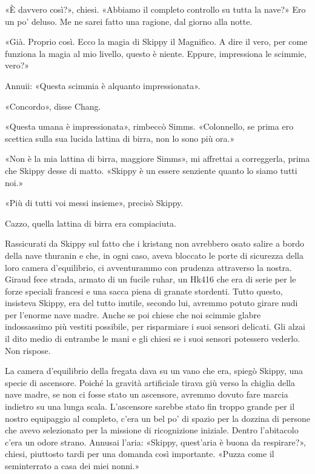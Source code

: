 «È davvero così?», chiesi. «Abbiamo il completo controllo su tutta la
nave?» Ero un po' deluso. Me ne sarei fatto una ragione, dal giorno alla
notte.

«Già. Proprio così. Ecco la magia di Skippy il Magnifico. A dire il
vero, per come funziona la magia al mio livello, questo è niente.
Eppure, impressiona le scimmie, vero?»

Annuii: «Questa scimmia è alquanto impressionata».

«Concordo», disse Chang.

«Questa umana è impressionata», rimbeccò Simms. «Colonnello, se prima
ero scettica sulla sua lucida lattina di birra, non lo sono più ora.»

«Non è la mia lattina di birra, maggiore Simms», mi affrettai a
correggerla, prima che Skippy desse di matto. «Skippy è un essere
senziente quanto lo siamo tutti noi.»

«Più di tutti voi messi insieme», precisò Skippy.

Cazzo, quella lattina di birra era compiaciuta.

\hfill\break

Rassicurati da Skippy sul fatto che i kristang non avrebbero osato
salire a bordo della nave thuranin e che, in ogni caso, aveva bloccato
le porte di sicurezza della loro camera d'equilibrio, ci avventurammo
con prudenza attraverso la nostra. Giraud fece strada, armato di un
fucile ruhar, un Hk416 che era di serie per le forze speciali francesi e
una sacca piena di granate stordenti. Tutto questo, insisteva Skippy,
era del tutto inutile, secondo lui, avremmo potuto girare nudi per
l'enorme nave madre. Anche se poi chiese che noi scimmie glabre
indossassimo più vestiti possibile, per risparmiare i suoi sensori
delicati. Gli alzai il dito medio di entrambe le mani e gli chiesi se i
suoi sensori potessero vederlo. Non rispose.

La camera d'equilibrio della fregata dava su un vano che era, spiegò
Skippy, una specie di ascensore. Poiché la gravità artificiale tirava
giù verso la chiglia della nave madre, se non ci fosse stato un
ascensore, avremmo dovuto fare marcia indietro su una lunga scala.
L'ascensore sarebbe stato fin troppo grande per il nostro equipaggio al
completo, c'era un bel po' di spazio per la dozzina di persone che avevo
selezionato per la missione di ricognizione iniziale. Dentro l'abitacolo
c'era un odore strano. Annusai l'aria: «Skippy, quest'aria è buona da
respirare?», chiesi, piuttosto tardi per una domanda così importante.
«Puzza come il seminterrato a casa dei miei nonni.»

